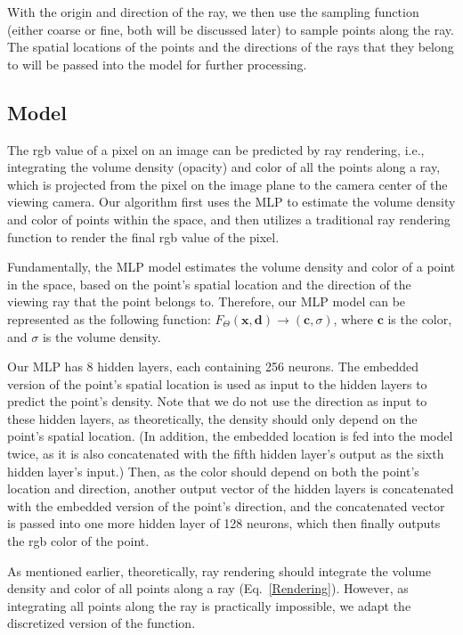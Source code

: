 With the origin and direction of the ray, we then use the sampling function (either coarse or fine, both will be discussed later) to sample points along the ray. The spatial locations of the points and the directions of the rays that they belong to will be passed into the model for further processing.

\subsection{Model}

The rgb value of a pixel on an image can be predicted by ray rendering, i.e., integrating the volume density (opacity) and color of all the points along a ray, which is projected from the pixel on the image plane to the camera center of the viewing camera. Our algorithm first uses the MLP to estimate the volume density and color of points within the space, and then utilizes a traditional ray rendering function to render the final rgb value of the pixel.

Fundamentally, the MLP model estimates the volume density and color of a point in the space, based on the point's spatial location and the direction of the viewing ray that the point belongs to. Therefore, our MLP model can be represented as the following function: $F_\Theta(\mathbf{x,d})\rightarrow(\mathbf{c},\sigma)$, where $\mathbf{c}$ is the color, and $\sigma$ is the volume density. 

Our MLP has 8 hidden layers, each containing 256 neurons. The embedded version of the point's spatial location is used as input to the hidden layers to predict the point's density. Note that we do not use the direction as input to these hidden layers, as theoretically, the density should only depend on the point's spatial location. (In addition, the embedded location is fed into the model twice, as it is also concatenated with the fifth hidden layer's output as the sixth hidden layer's input.) Then, as the color should depend on both the point's location and direction, another output vector of the hidden layers is concatenated with the embedded version of the point's direction, and the concatenated vector is passed into one more hidden layer of 128 neurons, which then finally outputs the rgb color of the point.

As mentioned earlier, theoretically, ray rendering should integrate the volume density and color of all points along a ray (Eq.~\ref{Rendering}). However, as integrating all points along the ray is practically impossible, we adapt the discretized version of the function.

